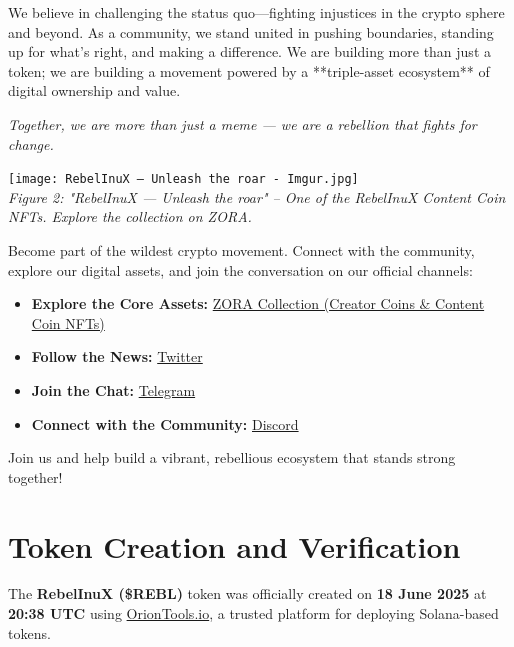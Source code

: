 \documentclass{article}
\begin{document}
We believe in challenging the status quo—fighting injustices in the crypto sphere and beyond. As a community, we stand united in pushing boundaries, standing up for what's right, and making a difference. We are building more than just a token; we are building a movement powered by a **triple-asset ecosystem** of digital ownership and value.

\textit{Together, we are more than just a meme — we are a rebellion that fights for change.}

\vspace{0.5em}

\begin{center}
  \texttt{[image: RebelInuX — Unleash the roar - Imgur.jpg]}
  \\ %
  \small\textit{Figure 2: "RebelInuX — Unleash the roar" – One of the RebelInuX Content Coin NFTs. Explore the collection on ZORA.}
\end{center}

\vspace{0.5em}

Become part of the wildest crypto movement. Connect with the community, explore our digital assets, and join the conversation on our official channels:

\begin{itemize}
  \item \textbf{Explore the Core Assets:} \href{https://zora.co/@rebelinux}{ZORA Collection (Creator Coins \& Content Coin NFTs)}
  \item \textbf{Follow the News:} \href{https://x.com/RebelInuX}{Twitter}
  \item \textbf{Join the Chat:} \href{https://t.me/+bNrP-ozjM501YWVk}{Telegram}
  \item \textbf{Connect with the Community:} \href{https://discord.gg/3gBzGY6j}{Discord}
\end{itemize}

Join us and help build a vibrant, rebellious ecosystem that stands strong together!

\section[
\texorpdfstring{\color{primaryColor}Token Creation and Verification}{Token Creation and Verification}
]{\color{primaryColor}\textbf{Token Creation and Verification}}

\noindent
The \textbf{RebelInuX (\$REBL)} token was officially created on \textbf{18 June 2025} at \textbf{20:38 UTC} using \href{https://oriontools.io}{OrionTools.io}, a trusted platform for deploying Solana-based tokens.
\end{document}
